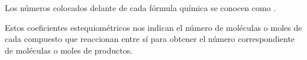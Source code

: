 Los números colocados delante de cada fórmula química se conocen como .
\vspace*{12pt}
%
%
%
%
\begin{centeredequation}
\end{centeredequation}
\vspace{8pt}

Estos coeficientes estequiométricos nos indican el número de moléculas o moles de cada compuesto que reaccionan entre sí para obtener el número correspondiente de moléculas o moles de productos.



